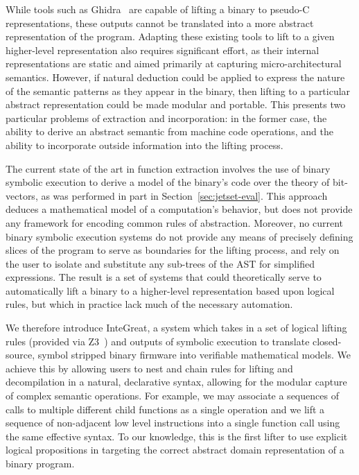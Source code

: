 While tools such as Ghidra~\cite{eagle2020ghidra} are capable of lifting a binary to pseudo-C representations, these outputs cannot be translated into a more abstract representation of the program.
Adapting these existing tools to lift to a given higher-level representation also requires significant effort, as their internal representations are static and aimed primarily at capturing micro-architectural semantics.
However, if natural deduction could be applied to express the nature of the semantic patterns as they appear in the binary, then lifting to a particular abstract representation could be made modular and portable.
This presents two particular problems of extraction and incorporation: in the former case, the ability to derive an abstract semantic from machine code operations, and the ability to incorporate outside information into the lifting process.

The current state of the art in function extraction involves the use of binary symbolic execution to derive a model of the binary's code over the theory of bit-vectors, as was performed in part in Section~\ref{sec:jetset-eval}.
This approach deduces a mathematical model of a computation's behavior, but does not provide any framework for encoding common rules of abstraction.
Moreover, no current binary symbolic execution systems do not provide any means of precisely defining slices of the program to serve as boundaries for the lifting process, and rely on the user to isolate and substitute any sub-trees of the AST for simplified expressions.
The result is a set of systems that could theoretically serve to automatically lift a binary to a higher-level representation based upon logical rules, but which in practice lack much of the necessary automation.

We therefore introduce InteGreat, a system which takes in a set of logical lifting rules (provided via Z3~\cite{zthree}) and outputs of symbolic execution to translate closed-source, symbol stripped binary firmware into verifiable mathematical models.
We achieve this by allowing users to nest and chain rules for lifting and decompilation in a natural, declarative syntax, allowing for the modular capture of complex semantic operations.
For example, we may associate a sequences of calls to multiple different child functions as a single operation and we lift a sequence of non-adjacent low level instructions into a single function call using the same effective syntax.
To our knowledge, this is the first lifter to use explicit logical propositions in targeting the correct abstract domain representation of a binary program.

